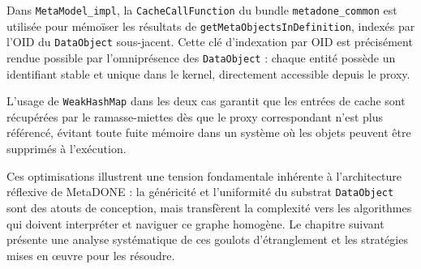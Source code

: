 Dans \texttt{MetaModel\_impl}, la \texttt{CacheCallFunction} du bundle
\texttt{metadone\_common} est utilisée pour mémoïser les résultats de
\texttt{getMetaObjectsInDefinition}, indexés par l'OID du
\texttt{DataObject} sous-jacent. Cette clé d'indexation par OID est
précisément rendue possible par l'omniprésence des \texttt{DataObject} :
chaque entité possède un identifiant stable et unique dans le kernel,
directement accessible depuis le proxy.

L'usage de \texttt{WeakHashMap} dans les deux cas garantit que les
entrées de cache sont récupérées par le ramasse-miettes dès que le proxy
correspondant n'est plus référencé, évitant toute fuite mémoire dans un
système où les objets peuvent être supprimés à l'exécution.

Ces optimisations illustrent une tension fondamentale inhérente à l'architecture réflexive de MetaDONE : la généricité et l'uniformité du substrat \texttt{DataObject} sont des atouts de conception, mais transfèrent la complexité vers les algorithmes qui doivent interpréter et naviguer ce graphe homogène. Le chapitre suivant présente une analyse systématique de ces goulots d'étranglement et les stratégies mises en œuvre pour les résoudre.